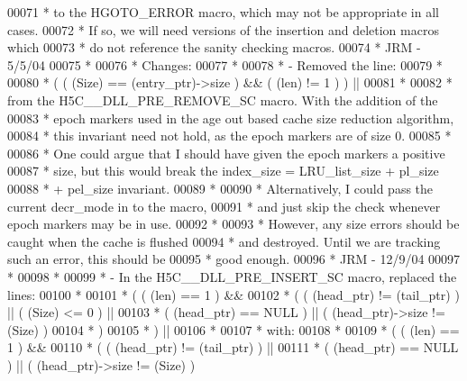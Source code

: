 \begin{DoxyCode}
00071 \textcolor{comment}{ * to the HGOTO\_ERROR macro, which may not be appropriate in all cases.}
00072 \textcolor{comment}{ * If so, we will need versions of the insertion and deletion macros which}
00073 \textcolor{comment}{ * do not reference the sanity checking macros.}
00074 \textcolor{comment}{ *                          JRM - 5/5/04}
00075 \textcolor{comment}{ *}
00076 \textcolor{comment}{ * Changes:}
00077 \textcolor{comment}{ *}
00078 \textcolor{comment}{ *  - Removed the line:}
00079 \textcolor{comment}{ *}
00080 \textcolor{comment}{ *        ( ( (Size) == (entry\_ptr)->size ) && ( (len) != 1 ) ) ||}
00081 \textcolor{comment}{ *}
00082 \textcolor{comment}{ *    from the H5C\_\_DLL\_PRE\_REMOVE\_SC macro.  With the addition of the}
00083 \textcolor{comment}{ *    epoch markers used in the age out based cache size reduction algorithm,}
00084 \textcolor{comment}{ *    this invariant need not hold, as the epoch markers are of size 0.}
00085 \textcolor{comment}{ *}
00086 \textcolor{comment}{ *    One could argue that I should have given the epoch markers a positive}
00087 \textcolor{comment}{ *    size, but this would break the index\_size = LRU\_list\_size + pl\_size}
00088 \textcolor{comment}{ *    + pel\_size invariant.}
00089 \textcolor{comment}{ *}
00090 \textcolor{comment}{ *    Alternatively, I could pass the current decr\_mode in to the macro,}
00091 \textcolor{comment}{ *    and just skip the check whenever epoch markers may be in use.}
00092 \textcolor{comment}{ *}
00093 \textcolor{comment}{ *    However, any size errors should be caught when the cache is flushed}
00094 \textcolor{comment}{ *    and destroyed.  Until we are tracking such an error, this should be}
00095 \textcolor{comment}{ *    good enough.}
00096 \textcolor{comment}{ *                                                     JRM - 12/9/04}
00097 \textcolor{comment}{ *}
00098 \textcolor{comment}{ *}
00099 \textcolor{comment}{ *  - In the H5C\_\_DLL\_PRE\_INSERT\_SC macro, replaced the lines:}
00100 \textcolor{comment}{ *}
00101 \textcolor{comment}{ *    ( ( (len) == 1 ) &&}
00102 \textcolor{comment}{ *      ( ( (head\_ptr) != (tail\_ptr) ) || ( (Size) <= 0 ) ||}
00103 \textcolor{comment}{ *        ( (head\_ptr) == NULL ) || ( (head\_ptr)->size != (Size) )}
00104 \textcolor{comment}{ *      )}
00105 \textcolor{comment}{ *    ) ||}
00106 \textcolor{comment}{ *}
00107 \textcolor{comment}{ *    with:}
00108 \textcolor{comment}{ *}
00109 \textcolor{comment}{ *    ( ( (len) == 1 ) &&}
00110 \textcolor{comment}{ *      ( ( (head\_ptr) != (tail\_ptr) ) ||}
00111 \textcolor{comment}{ *        ( (head\_ptr) == NULL ) || ( (head\_ptr)->size != (Size) )}

\end{DoxyCode}
